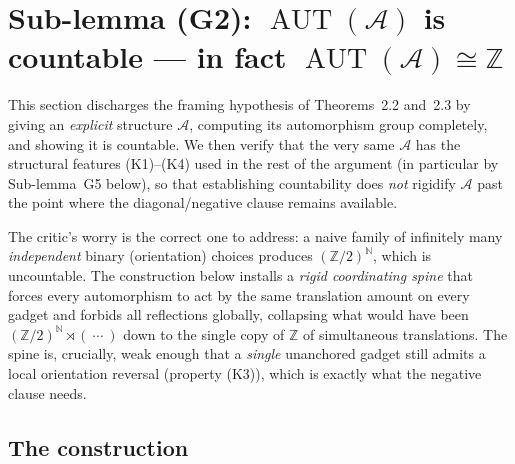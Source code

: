 \documentclass[12pt,fullpage]{article}
\theoremstyle{definition}
\newcommand{\A}{\mathcal{A}}
\newcommand{\N}{\mathbb{N}}
\newcommand{\Z}{{\mathbb{Z}}}
\newcommand{\AUT}{\operatorname{AUT}}
\begin{document}
\section*{Sub-lemma (G2): $\AUT(\A)$ is countable --- in fact $\AUT(\A)\cong\Z$}

This section discharges the framing hypothesis of Theorems~2.2 and~2.3 by
giving an \emph{explicit} structure $\A$, computing its automorphism group
completely, and showing it is countable.  We then verify that the very same
$\A$ has the structural features (K1)--(K4) used in the rest of the argument
(in particular by Sub-lemma~G5 below), so that establishing countability does
\emph{not} rigidify $\A$ past the point where the diagonal/negative clause
remains available.

The critic's worry is the correct one to address: a naive family of infinitely
many \emph{independent} binary (orientation) choices produces
$(\Z/2)^{\N}$, which is uncountable.  The construction below installs a
\emph{rigid coordinating spine} that forces every automorphism to act by the
same translation amount on every gadget and forbids all reflections globally,
collapsing what would have been $(\Z/2)^{\N}\rtimes(\ \cdots\ )$ down to the
single copy of $\Z$ of simultaneous translations.  The spine is, crucially,
weak enough that a \emph{single} unanchored gadget still admits a local
orientation reversal (property (K3)), which is exactly what the negative
clause needs.

\subsection*{The construction}
\end{document}
